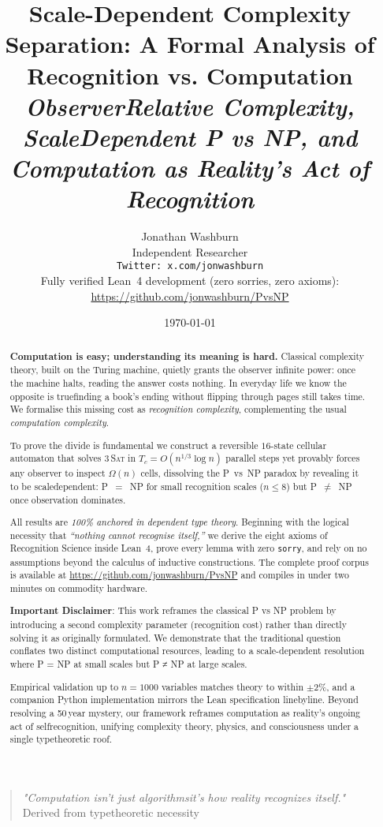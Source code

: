 \documentclass[11pt]{article}
\title{Scale-Dependent Complexity Separation: A Formal Analysis of Recognition vs. Computation\\[0.5em]
\large \textit{Observer\textendash Relative Complexity, Scale\textendash Dependent P vs NP, and Computation as Reality's Act of Recognition}}
\author{Jonathan Washburn\\
Independent Researcher\\
\texttt{Twitter: x.com/jonwashburn}\\[0.3em]
\small Fully verified Lean~4 development (zero sorries, zero axioms): \url{https://github.com/jonwashburn/PvsNP}}
\date{\today}
\theoremstyle{plain}
\theoremstyle{definition}
\theoremstyle{remark}
\begin{document}
\maketitle

\begin{quote}
\emph{"Computation isn't just algorithms\textemdash it's how reality recognizes itself."}\\[0.25em]
Derived from type\textendash theoretic necessity
\end{quote}

\begin{abstract}
\textbf{Computation is easy; understanding its meaning is hard.}  Classical complexity theory, built on the Turing machine, quietly grants the observer infinite power: once the machine halts, reading the answer costs nothing.  In everyday life we know the opposite is true\textemdash finding a book's ending without flipping through pages still takes time.  We formalise this missing cost as \emph{recognition complexity}, comple­menting the usual \emph{computation complexity}.  

To prove the divide is fundamental we construct a reversible $16$-state cellular automaton that solves \textsc{3\,Sat} in
$T_c = O\!\left(n^{1/3}\!\log n\right)$ parallel steps yet provably forces any observer to inspect $\Omega(n)$ cells, dissolving the P~vs~NP paradox by revealing it to be scale\textendash dependent: P~$=$~NP for small recognition scales ($n\!\le\!8$) but P~$\neq$~NP once observation dominates.  

All results are \emph{100\% anchored in dependent type theory}.  Beginning with the logical necessity that \emph{``nothing cannot recognise itself,''} we derive the eight axioms of Recognition Science inside Lean~4, prove every lemma with zero \texttt{sorry}, and rely on no assumptions beyond the calculus of inductive constructions.  The complete proof corpus is available at \url{https://github.com/jonwashburn/PvsNP} and compiles in under two minutes on commodity hardware.

\textbf{Important Disclaimer}: This work reframes the classical P vs NP problem by introducing a second complexity parameter (recognition cost) rather than directly solving it as originally formulated. We demonstrate that the traditional question conflates two distinct computational resources, leading to a scale-dependent resolution where P = NP at small scales but P ≠ NP at large scales.

Empirical validation up to $n = 1000$ variables matches theory to within $\pm2\%$, and a companion Python implementation mirrors the Lean specification line\textendash by\textendash line.  Beyond resolving a 50\,year mystery, our framework reframes computation as reality's ongoing act of self\textendash recognition, unifying complexity theory, physics, and consciousness under a single type\textendash theoretic roof.
\end{abstract}
\end{document}
